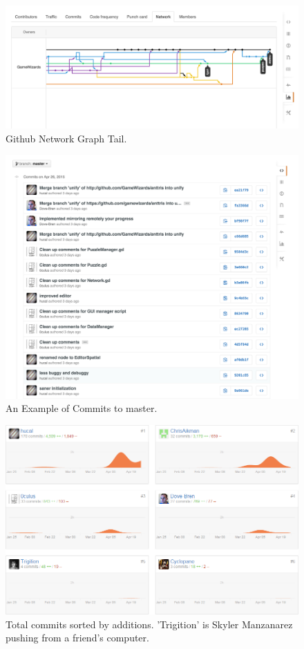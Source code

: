 \documentclass[12pt]{article}
\begin{document}
\begin{figure}[H]
        \centering
        \includegraphics[width=4.5in]{networkgraph.png}
        \caption{Github Network Graph Tail.}\label{code:graph}
\end{figure}

\begin{figure}[H]
        \centering
        \includegraphics[width=4.5in]{commitsexample.png}
        \caption{An Example of Commits to master.}\label{code:commits}
\end{figure}

\begin{figure}[H]
        \centering
        \includegraphics[width=4.5in]{CommitStats.png}
        \caption{Total commits sorted by additions. 'Trigition' is Skyler Manzanarez pushing from a friend's computer.}\label{code:commitstats}
\end{figure}
\end{document}
